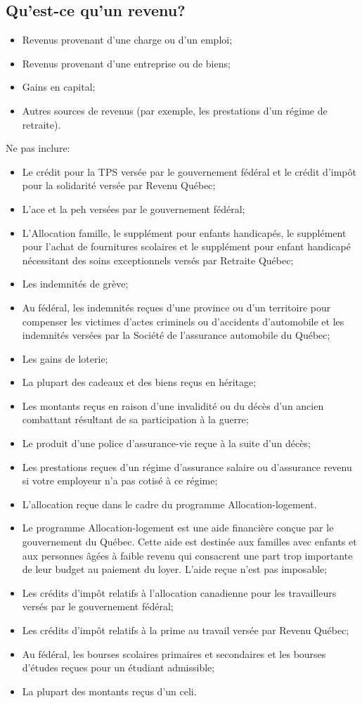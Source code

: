 \subsection{Qu'est-ce qu'un revenu?}
\caqc
\begin{itemize}
	\item Revenus provenant d'une charge ou d'un emploi;
	\item Revenus provenant d'une entreprise ou de biens;
	\item Gains en capital;
	\item Autres sources de revenus (par exemple, les prestations d'un régime de retraite).
\end{itemize}

Ne pas inclure:
\caqc
\begin{itemize}
	\item Le crédit pour la TPS versée par le gouvernement fédéral et le crédit d'impôt pour la solidarité versée par Revenu Québec;
	\item L'\acrfull{ace} et la \acrfull{peh} versées par le gouvernement fédéral;
	\item L'Allocation famille, le supplément pour enfants handicapés, le supplément pour l'achat de fournitures scolaires et le supplément pour enfant handicapé nécessitant des soins exceptionnels versés par Retraite Québec;
	\item Les indemnités de grève;
	\item Au fédéral, les indemnités reçues d'une province ou d'un territoire pour compenser les victimes d'actes criminels ou d'accidents d'automobile et les indemnités versées par la Société de l'assurance automobile du Québec;
	\item Les gains de loterie;
	\item La plupart des cadeaux et des biens reçus en héritage;
	\item Les montants reçus en raison d'une invalidité ou du décès d'un ancien combattant résultant de sa participation à la guerre;
	\item Le produit d'une police d'assurance-vie reçue à la suite d'un décès;
	\item Les prestations reçues d'un régime d'assurance salaire ou d'assurance revenu si votre employeur n'a pas cotisé à ce régime;
	\item L'allocation reçue dans le cadre du programme Allocation-logement.
	\item Le programme Allocation-logement est une aide financière conçue par le gouvernement du Québec. Cette aide est destinée aux familles avec enfants et aux personnes âgées à faible revenu qui consacrent une part trop importante de leur budget au paiement du loyer. L'aide reçue n'est pas imposable;
	\item Les crédits d'impôt relatifs à l'allocation canadienne pour les travailleurs  versés par le gouvernement fédéral;
	\item Les crédits d'impôt relatifs à la prime au travail versée par Revenu Québec;
	\item Au fédéral, les bourses scolaires primaires et secondaires et les bourses d'études reçues pour un étudiant admissible;
	\item La plupart des montants reçus d'un \acrfull{celi}.
\end{itemize}
